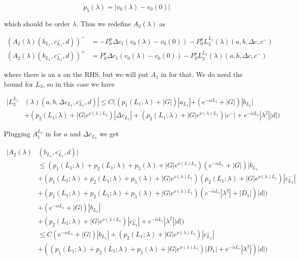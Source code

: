 \documentclass[12pt]{article}
\begin{document}
\begin{enumerate}
\[
p_5(\lambda) = |v_0(\lambda) - v_0(0)| 
\]

which should be order $\lambda$. Thus we redefine $A_2(\lambda)$ as 

\begin{align*}
(A_2(\lambda)(b_{L_1}, c_{L_1}^-, d))^- &= -P^u_0 \Delta c_1 (v_0(\lambda) - v_0(0)) - P^u_0 L_3^{L_1}(\lambda)(a, b, \Delta c, c^-) \\
(A_2(\lambda)(b_{L_1}, c_{L_1}^-, d))^+ &= P^s_0 \Delta c_1 (v_0(\lambda) - v_0(0)) - P^s_0 L_3^{L_1}(\lambda)(a, b, \Delta c, c^-)
\end{align*}

where there is an $a$ on the RHS, but we will put $A_1$ in for that. We do need the bound for $L_3$, so in this case we have

\begin{align*}
|L_3^{L_1}&(\lambda)(a, b, \Delta c_{L_1}, c_{L_1}^-, d)| \leq C ( (p_1(L_1; \lambda) + |G|)|a_{L_1}| + (e^{-\alpha L_1} + |G|)|b_{L_1}| \\
&+ ( p_2(L_1; \lambda) + |G|e^{\nu(\lambda)L_1})|\Delta c_{L_1}| + ( p_2(L_1; \lambda) + |G|e^{\nu(\lambda)L_1})|c^-|+ e^{-\tilde{\alpha} L_1} |\lambda^2||d| )
\end{align*}

Plugging $A_1^{L_1}$ in for $a$ and $\Delta c_{L_1}$ we get

\begin{align*}
|A_2(\lambda)&(b_{L_1}, c_{L_1}^-, d)| \\
&\leq ( p_1(L_1; \lambda) + p_2(L_1; \lambda) + p_5(\lambda) + |G|e^{\nu(\lambda)L_1})( e^{-\alpha L_1} + |G|)|b_{L_1}  \\
&+ ( p_1(L_1; \lambda) + p_2(L_1; \lambda) + p_5(\lambda) + |G|e^{\nu(\lambda)L_1})( p_2(L_1; \lambda) + |G|e^{\nu(\lambda) L_1})|c_{L_1}^-| \\
&+ ( p_1(L_1; \lambda) + p_2(L_1; \lambda) + p_5(\lambda) + |G|e^{\nu(\lambda)L_1})(e^{-\tilde{\alpha}L_1}|\lambda^2| + |D_1|)|d|) \\  
&+ ( e^{-\alpha L_1} + |G|)|b_{L_1}| \\
&+ ( p_2(L_1; \lambda) + |G|e^{\nu(\lambda)L_1})|c_{L_1}^-|+ e^{-\tilde{\alpha} L_1} |\lambda^2||d| ) \\
&\leq C( e^{-\alpha L_1} + |G|)|b_{L_1}| + ( p_2(L_1; \lambda) + |G|e^{\nu(\lambda)L_1})|c_{L_1}^-| \\
&+ (( p_1(L_1; \lambda) + p_2(L_1; \lambda) + p_5(\lambda) + |G|e^{\nu(\lambda)L_1})|D_1| + e^{-\tilde{\alpha}L_1}|\lambda^2|)|d| ) 
\end{align*}



\end{enumerate}
\end{document}
